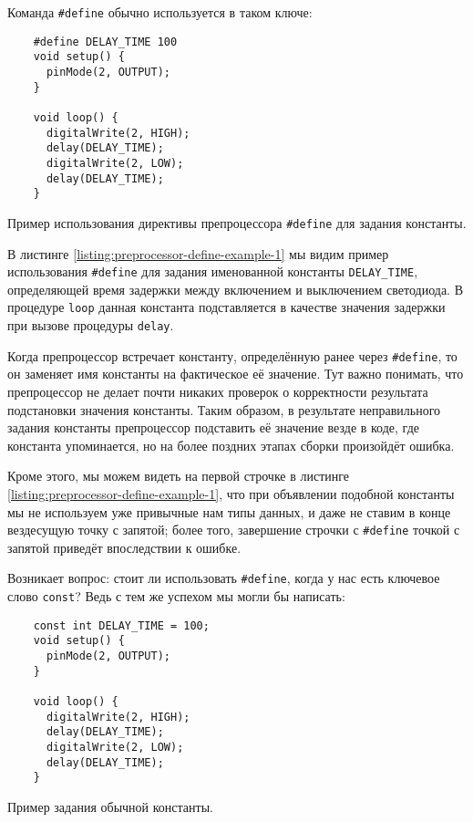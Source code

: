 \documentclass[../sparc.tex]{subfiles}
\begin{document}
Команда \texttt{#define} обычно используется в таком ключе:

\begin{listing}[H]
  \begin{verbatim}
    #define DELAY_TIME 100
    void setup() {
      pinMode(2, OUTPUT);
    }

    void loop() {
      digitalWrite(2, HIGH);
      delay(DELAY_TIME);
      digitalWrite(2, LOW);
      delay(DELAY_TIME);
    }
  \end{verbatim}
  \label{listing:preprocessor-define-example-1}
  \caption{Пример использования директивы препроцессора
    \texttt{#define} для задания константы.}
\end{listing}

В листинге \ref{listing:preprocessor-define-example-1} мы видим пример
использования \texttt{#define} для задания именованной константы
\texttt{DELAY_TIME}, определяющей время задержки между включением и
выключением светодиода.  В процедуре \texttt{loop} данная константа
подставляется в качестве значения задержки при вызове процедуры
\texttt{delay}.

Когда препроцессор встречает константу, определённую ранее через
\texttt{#define}, то он заменяет имя константы на фактическое её
значение.  Тут важно понимать, что препроцессор не делает почти никаких проверок
о корректности результата подстановки значения константы.  Таким образом, в
результате неправильного задания константы препроцессор подставить её значение
везде в коде, где константа упоминается, но на более поздних этапах сборки
произойдёт ошибка.

Кроме этого, мы можем видеть на первой строчке в листинге
\ref{listing:preprocessor-define-example-1}, что при объявлении подобной константы
мы не используем уже привычные нам типы данных, и даже не ставим в конце
вездесущую точку с запятой; более того, завершение строчки с
\texttt{#define} точкой с запятой приведёт впоследствии к ошибке.

Возникает вопрос: стоит ли использовать \texttt{#define}, когда у нас
есть ключевое слово \texttt{const}?  Ведь с тем же успехом мы могли бы
написать:

\begin{listing}[H]
  \begin{verbatim}
    const int DELAY_TIME = 100;
    void setup() {
      pinMode(2, OUTPUT);
    }

    void loop() {
      digitalWrite(2, HIGH);
      delay(DELAY_TIME);
      digitalWrite(2, LOW);
      delay(DELAY_TIME);
    }
  \end{verbatim}
  \label{listing:preprocessor-define-example-2}
  \caption{Пример задания обычной константы.}
\end{listing}
\end{document}
